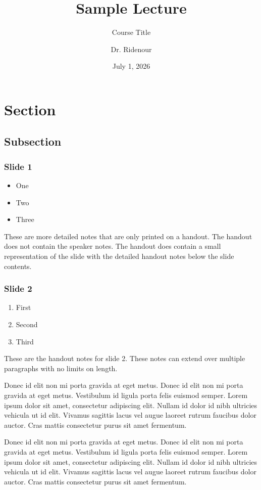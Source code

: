 \documentclass[11pt]{article}
\author{Dr. Ridenour}
\date{July  1, 2026}
\title{Sample Lecture}
\subtitle{Course Title}
\institute{Department of Philosophy}
\begin{document}
\maketitle
\section{Section}
\label{sec:org433079e}

\subsection{Subsection}
\label{sec:org0c5130f}

\begin{frame}[label={sec:orgbd1568c}]
 \frametitle{Slide 1}
\begin{itemize}
\item One
\item Two
\item Three
\end{itemize}
\end{frame}
These are more detailed notes that are only printed on a handout. The handout does not contain the speaker notes. The handout does contain a small representation of the slide with the detailed handout notes below the slide contents.
\begin{frame}[label={sec:org92d8d32}]
 \frametitle{Slide 2}
\begin{enumerate}
\item First
\item Second
\item Third
\end{enumerate}
\end{frame}
These are the handout notes for slide 2. These notes can extend over multiple paragraphs with no limits on length.

Donec id elit non mi porta gravida at eget metus. Donec id elit non mi porta gravida at eget metus. Vestibulum id ligula porta felis euismod semper. Lorem ipsum dolor sit amet, consectetur adipiscing elit. Nullam id dolor id nibh ultricies vehicula ut id elit. Vivamus sagittis lacus vel augue laoreet rutrum faucibus dolor auctor. Cras mattis consectetur purus sit amet fermentum.

Donec id elit non mi porta gravida at eget metus. Donec id elit non mi porta gravida at eget metus. Vestibulum id ligula porta felis euismod semper. Lorem ipsum dolor sit amet, consectetur adipiscing elit. Nullam id dolor id nibh ultricies vehicula ut id elit. Vivamus sagittis lacus vel augue laoreet rutrum faucibus dolor auctor. Cras mattis consectetur purus sit amet fermentum.
\end{document}
